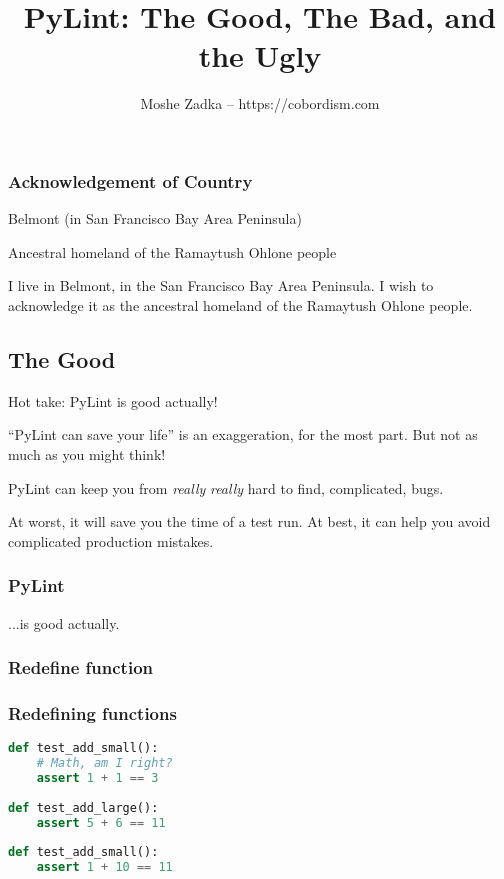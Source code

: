 \documentclass[ignorenonframetext]{beamer}
\title{PyLint: The Good, The Bad, and the Ugly}
\author{Moshe Zadka -- https://cobordism.com}
\date{}
\begin{document}
\begin{titlepage}
\maketitle
\end{titlepage}

\frame{\titlepage}

\begin{frame}
\frametitle{Acknowledgement of Country}

Belmont (in San Francisco Bay Area Peninsula)

Ancestral homeland of the Ramaytush Ohlone people

\end{frame}

I live in Belmont, in the San Francisco Bay Area Peninsula. I wish to
acknowledge it as the ancestral homeland of the Ramaytush Ohlone people.

\hypertarget{the-good}{%
\subsection{The Good}\label{the-good}}

Hot take: PyLint is good actually!

``PyLint can save your life'' is an exaggeration, for the most part. But
not as much as you might think!

PyLint can keep you from \emph{really} \emph{really} hard to find,
complicated, bugs.

At worst, it will save you the time of a test run. At best, it can help
you avoid complicated production mistakes.

\begin{frame}[fragile]
\frametitle{PyLint}

\pause
...is good actually.
\end{frame}

\hypertarget{redefine-function}{%
\subsubsection{Redefine function}\label{redefine-function}}

\begin{frame}[fragile]
\frametitle{Redefining functions}

\begin{lstlisting}[language=Python]
def test_add_small():
    # Math, am I right?
    assert 1 + 1 == 3
    
def test_add_large():
    assert 5 + 6 == 11
    
def test_add_small():
    assert 1 + 10 == 11
\end{lstlisting}

\end{frame}
\end{document}
